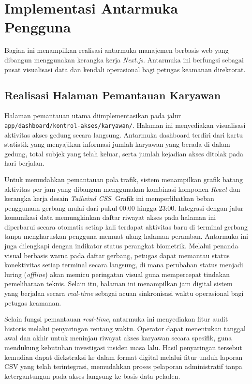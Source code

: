 \section{Implementasi Antarmuka Pengguna}
Bagian ini menampilkan realisasi antarmuka manajemen berbasis web yang dibangun menggunakan kerangka kerja \textit{Next.js}. Antarmuka ini berfungsi sebagai pusat visualisasi data dan kendali operasional bagi petugas keamanan direktorat.

\subsection{Realisasi Halaman Pemantauan Karyawan}
Halaman pemantauan utama diimplementasikan pada jalur \texttt{app/dashboard/kontrol-akses/karyawan/}. Halaman ini menyediakan visualisasi aktivitas akses gedung secara langsung. Antarmuka dashboard terdiri dari kartu statistik yang menyajikan informasi jumlah karyawan yang berada di dalam gedung, total subjek yang telah keluar, serta jumlah kejadian akses ditolak pada hari berjalan.

Untuk memudahkan pemantauan pola trafik, sistem menampilkan grafik batang aktivitas per jam yang dibangun menggunakan kombinasi komponen \textit{React} dan kerangka kerja desain \textit{Tailwind CSS}. Grafik ini memperlihatkan beban penggunaan gerbang mulai dari pukul 00:00 hingga 23:00. Integrasi dengan jalur komunikasi data memungkinkan daftar riwayat akses pada halaman ini diperbarui secara otomatis setiap kali terdapat aktivitas baru di terminal gerbang tanpa mengharuskan pengguna memuat ulang halaman peramban. Antarmuka ini juga dilengkapi dengan indikator status perangkat biometrik. Melalui penanda visual berbasis warna pada daftar gerbang, petugas dapat memantau status konektivitas setiap terminal secara langsung, di mana perubahan status menjadi luring (\textit{offline}) akan memicu peringatan visual guna mempercepat tindakan pemeliharaan teknis. Selain itu, halaman ini menampilkan jam digital sistem yang berjalan secara \textit{real-time} sebagai acuan sinkronisasi waktu operasional bagi petugas keamanan.

Selain fungsi pemantauan \textit{real-time}, antarmuka ini menyediakan fitur audit historis melalui penyaringan rentang waktu. Operator dapat menentukan tanggal awal dan akhir untuk meninjau riwayat akses karyawan secara spesifik, guna mendukung kebutuhan investigasi insiden masa lalu. Hasil penyaringan tersebut kemudian dapat diekstraksi ke dalam format digital melalui fitur unduh laporan CSV yang telah terintegrasi, memudahkan proses pelaporan administratif tanpa ketergantungan pada akses langsung ke basis data peladen.

